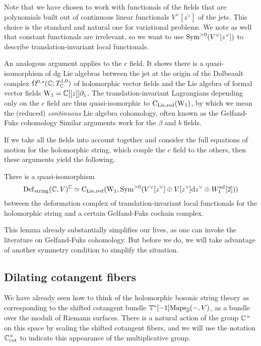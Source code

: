 Note that we have chosen to work with functionals of the fields
that are polynomials built out of continuous linear functionals $V^\vee[z^\vee]$ of the jets.
This choice is the standard and natural one for variational problems.
We note as well that constant functionals are irrelevant,
so we want to use ${\rm Sym}^{>0}(V^\vee[z^\vee])$ to describe translation-invariant local functionals.

An analogous argument applies to the $c$ field. 
It shows there is a quasi-isomorphism of dg Lie algebras 
between the jet at the origin of the Dolbeault complex $\Omega^{0,*}(\mathbb C ; T^{1,0}_\mathbb C)$ of holomorphic vector fields 
and the Lie algebra of formal vector fields ${\rm W}_1 = \mathbb C[[z]]\partial_z$.
The translation-invariant Lagrangians depending only on the $c$ field 
are thus quasi-isomorphic to ${\rm C}_{\rm Lie,red}({\rm W}_1)$,
by which we mean the (reduced) {\em continuous} Lie algebra cohomology,
often known as the Gelfand-Fuks cohomology 
Similar arguments work for the $\beta$ and $b$ fields.

If we take all the fields into account together and consider the full equations of motion 
for the holomorphic string,
which couple the $c$ field to the others,
then these arguments yield the following.

\begin{lem}
There is a quasi-isomorphism 
\[
{\rm Def}_{\rm string}(\mathbb C,V)^\mathbb C \simeq {\rm C}_{\rm Lie,red}({\rm W}_1, {\rm Sym}^{>0}(V^\vee[z^\vee] \oplus V[z^\vee] {\rm d} z^\vee \oplus W_1^{\rm ad}[2])) 
\]
between the deformation complex of translation-invariant local functionals for the holomorphic string and a certain Gelfand-Fuks cochain complex.
\end{lem}


This lemma already substantially simplifies our lives, 
as one can invoke the literature on Gelfand-Fuks cohomology.
But before we do,
we will take advantage of another symmetry condition to simplify the situation.

\subsection{Dilating cotangent fibers}

We have already seen how to think of the holomorphic bosonic string theory 
as corresponding to the shifted cotangent bundle $\mathbb T^*[-1]{\rm Maps}_{\overline{\partial}}(-, V)$, 
as a bundle over the moduli of Riemann surfaces. 
There is a natural action of the group $ \mathbb C^\times$ on this space
by scaling the shifted cotangent fibers,
and we will use the notation $\mathbb C^\times_{\rm cot}$ to indicate this appearance of the multiplicative group.

